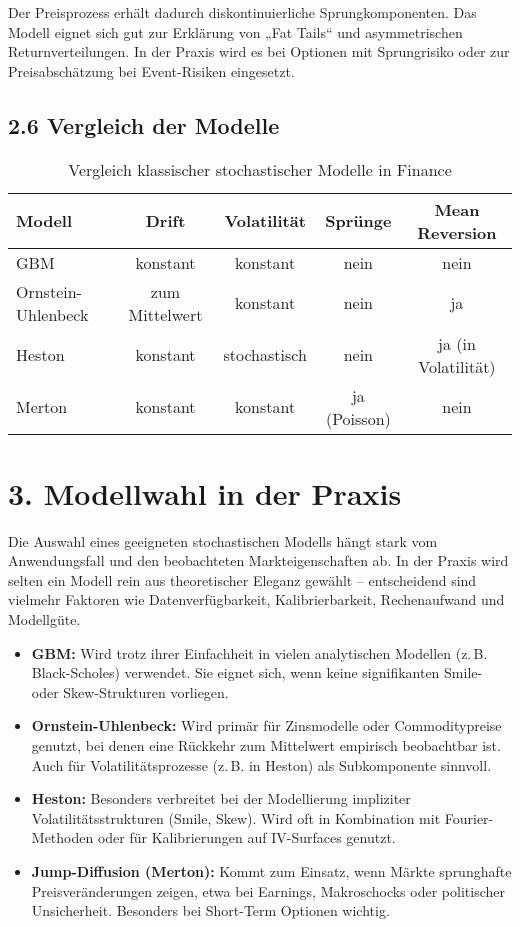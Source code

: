 \documentclass[a4paper,12pt]{article}
\begin{document}
Der Preisprozess erhält dadurch diskontinuierliche Sprungkomponenten. Das Modell eignet sich gut zur Erklärung von „Fat Tails“ und asymmetrischen Returnverteilungen. In der Praxis wird es bei Optionen mit Sprungrisiko oder zur Preisabschätzung bei Event-Risiken eingesetzt.

\subsection*{2.6 Vergleich der Modelle}

\begin{table}[h]
\centering
\renewcommand{\arraystretch}{1.3}
\begin{tabular}{|l|c|c|c|c|}
\hline
\textbf{Modell} & \textbf{Drift} & \textbf{Volatilität} & \textbf{Sprünge} & \textbf{Mean Reversion} \\
\hline
GBM & konstant & konstant & nein & nein \\
Ornstein-Uhlenbeck & zum Mittelwert & konstant & nein & ja \\
Heston & konstant & stochastisch & nein & ja (in Volatilität) \\
Merton & konstant & konstant & ja (Poisson) & nein \\
\hline
\end{tabular}
\caption{Vergleich klassischer stochastischer Modelle in Finance}
\end{table}

\clearpage
\section*{3. Modellwahl in der Praxis}

Die Auswahl eines geeigneten stochastischen Modells hängt stark vom Anwendungsfall und den beobachteten Markteigenschaften ab. In der Praxis wird selten ein Modell rein aus theoretischer Eleganz gewählt – entscheidend sind vielmehr Faktoren wie Datenverfügbarkeit, Kalibrierbarkeit, Rechenaufwand und Modellgüte.

\begin{itemize}
  \item \textbf{GBM:} Wird trotz ihrer Einfachheit in vielen analytischen Modellen (z.\,B. Black-Scholes) verwendet. Sie eignet sich, wenn keine signifikanten Smile- oder Skew-Strukturen vorliegen.
  
  \item \textbf{Ornstein-Uhlenbeck:} Wird primär für Zinsmodelle oder Commoditypreise genutzt, bei denen eine Rückkehr zum Mittelwert empirisch beobachtbar ist. Auch für Volatilitätsprozesse (z.\,B. in Heston) als Subkomponente sinnvoll.
  
  \item \textbf{Heston:} Besonders verbreitet bei der Modellierung impliziter Volatilitätsstrukturen (Smile, Skew). Wird oft in Kombination mit Fourier-Methoden oder für Kalibrierungen auf IV-Surfaces genutzt.
  
  \item \textbf{Jump-Diffusion (Merton):} Kommt zum Einsatz, wenn Märkte sprunghafte Preisveränderungen zeigen, etwa bei Earnings, Makroschocks oder politischer Unsicherheit. Besonders bei Short-Term Optionen wichtig.
\end{itemize}
\end{document}
